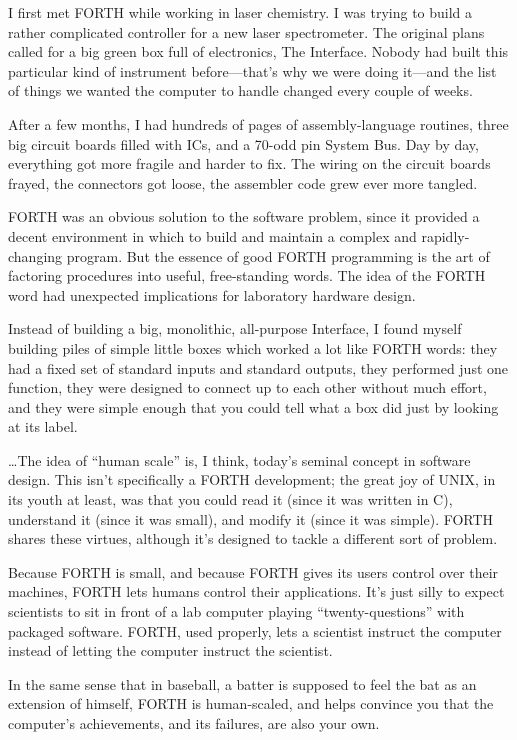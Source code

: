 \begin{tfquot}
I first met FORTH while working in laser chemistry.  I was trying to build a
rather complicated controller for a new laser spectrometer.  The original
plans called for a big green box full of electronics, The Interface.  Nobody 
had built this particular kind of instrument before---that's why we were 
doing it---and the list of things we wanted the computer to handle changed
every couple of weeks.

After a few months, I had hundreds of pages of assembly-language 
routines, three big circuit boards filled with ICs, and a 70-odd pin System
Bus.  Day by day, everything got more fragile and harder to fix.  The wiring 
on the circuit boards frayed, the connectors got loose, the assembler code
grew ever more tangled.

FORTH was an obvious solution to the software problem, since it provided
a decent environment in which to build and maintain a complex and
rapidly-changing program.  But the essence of good FORTH programming is the 
art of factoring procedures into useful, free-standing words.  The idea of the
FORTH word had unexpected implications for laboratory hardware design.

Instead of building a big, monolithic, all-purpose Interface, I found myself
building piles of simple little boxes which worked a lot like FORTH words:
they had a fixed set of standard inputs and standard outputs, they performed
just one function, they were designed to connect up to each other 
without much effort, and they were simple enough that you could tell what 
a box did just by looking at its label.

\ldots The idea of ``human scale'' is, I think, today's seminal concept in 
software design.  This isn't specifically a FORTH development; the great joy of
UNIX, in its youth at least, was that you could read it (since it was written
in C), understand it (since it was small), and modify it (since it was simple).
FORTH shares these virtues, although it's designed to tackle a different 
sort of problem.

Because FORTH is small, and because FORTH gives its users control over
their machines, FORTH lets humans control their applications.  It's just
silly to expect scientists to sit in front of a lab computer playing
``twenty-questions'' with packaged software.  FORTH, used properly, lets a scientist
instruct the computer instead of letting the computer instruct the scientist.

In the same sense that in baseball, a batter is supposed to feel the bat as an 
extension of himself, FORTH is human-scaled, and helps convince you that
the computer's achievements, and its failures, are also your own.
\end{tfquot}
